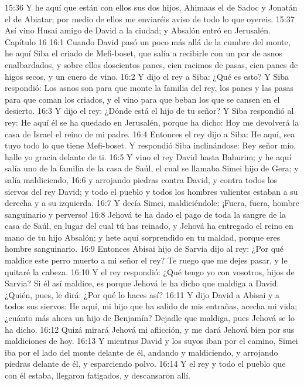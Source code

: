 15:36 Y he aquí que están con ellos sus dos hijos, Ahimaas el de Sadoc y Jonatán el de Abiatar; por medio de ellos me enviaréis aviso de todo lo que oyereis.  
15:37 Así vino Husai amigo de David a la ciudad; y Absalón entró en Jerusalén.  
Capítulo 16 
16:1 Cuando David pasó un poco más allá de la cumbre del monte, he aquí Siba el criado de Mefi-boset, que salía a recibirle con un par de asnos enalbardados, y sobre ellos doscientos panes, cien racimos de pasas, cien panes de higos secos, y un cuero de vino.  
16:2 Y dijo el rey a Siba: ¿Qué es esto? Y Siba respondió: Los asnos son para que monte la familia del rey, los panes y las pasas para que coman los criados, y el vino para que beban los que se cansen en el desierto.  
16:3 Y dijo el rey: ¿Dónde está el hijo de tu señor? Y Siba respondió al rey: He aquí él se ha quedado en Jerusalén, porque ha dicho: Hoy me devolverá la casa de Israel el reino de mi padre.  
16:4 Entonces el rey dijo a Siba: He aquí, sea tuyo todo lo que tiene Mefi-boset. Y respondió Siba inclinándose: Rey señor mío, halle yo gracia delante de ti.  
16:5 Y vino el rey David hasta Bahurim; y he aquí salía uno de la familia de la casa de Saúl, el cual se llamaba Simei hijo de Gera; y salía maldiciendo,  
16:6 y arrojando piedras contra David, y contra todos los siervos del rey David; y todo el pueblo y todos los hombres valientes estaban a su derecha y a su izquierda.  
16:7 Y decía Simei, maldiciéndole: ¡Fuera, fuera, hombre sanguinario y perverso!  
16:8 Jehová te ha dado el pago de toda la sangre de la casa de Saúl, en lugar del cual tú has reinado, y Jehová ha entregado el reino en mano de tu hijo Absalón; y hete aquí sorprendido en tu maldad, porque eres hombre sanguinario.  
16:9 Entonces Abisai hijo de Sarvia dijo al rey: ¿Por qué maldice este perro muerto a mi señor el rey? Te ruego que me dejes pasar, y le quitaré la cabeza.  
16:10 Y el rey respondió: ¿Qué tengo yo con vosotros, hijos de Sarvia? Si él así maldice, es porque Jehová le ha dicho que maldiga a David. ¿Quién, pues, le dirá: ¿Por qué lo haces así?  
16:11 Y dijo David a Abisai y a todos sus siervos: He aquí, mi hijo que ha salido de mis entrañas, acecha mi vida; ¿cuánto más ahora un hijo de Benjamín? Dejadle que maldiga, pues Jehová se lo ha dicho.  
16:12 Quizá mirará Jehová mi aflicción, y me dará Jehová bien por sus maldiciones de hoy.  
16:13 Y mientras David y los suyos iban por el camino, Simei iba por el lado del monte delante de él, andando y maldiciendo, y arrojando piedras delante de él, y esparciendo polvo.  
16:14 Y el rey y todo el pueblo que con él estaba, llegaron fatigados, y descansaron allí.  
